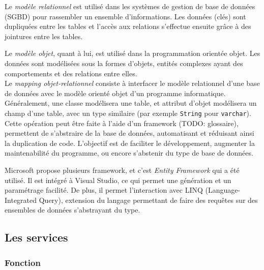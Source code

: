 Le \textit{modèle relationnel} est utilisé dans les systèmes de gestion de base de données (SGBD) pour rassembler un ensemble d'informations. Les données (clés) sont dupliquées entre les tables et l'accès aux relations s'effectue ensuite grâce à des jointures entre les tables.

Le \textit{modèle objet}, quant à lui, est utilisé dans la programmation orientée objet. Les données sont modélisées sous la formes d'objets, entités complexes ayant des comportements et des relations entre elles.
\\

Le \textit{mapping objet-relationnel} consiste à interfacer le modèle relationnel d'une base de données avec le modèle orienté objet d'un programme informatique. Généralement, une classe modélisera une table, et attribut d'objet modélisera un champ d'une table, avec un type similaire (par exemple \lstinline{String} pour \lstinline{varchar}).
\\

Cette opération peut être faite à l'aide d'un framework (TODO: glossaire), permettent de s'abstraire de la base de données, automatisant et réduisant ainsi la duplication de code. L'objectif est de faciliter le développement, augmenter la maintenabilité du programme, ou encore s'abstenir du type de base de données.

Microsoft propose plusieurs framework, et c'est \textit{Entity Framework} qui a été utilisé. Il est intégré à Visual Studio, ce qui permet une génération et un paramétrage facilité. De plus, il permet l'interaction avec  LINQ (Language-Integrated Query), extension du langage permettant de faire des requêtes sur des ensembles de données s'abstrayant du type.


\subsection{Les services}


\subsubsection{Fonction}

